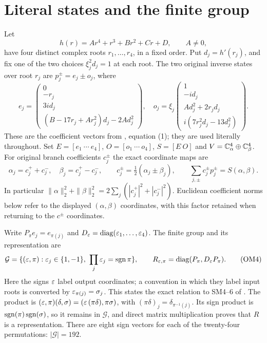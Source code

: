 \section{Literal states and the finite group}
Let
\[
 h(r)=Ar^4+r^3+Br^2+Cr+D,\qquad A\ne0,
 \tag{OM1}
\]
have four distinct complex roots $r_1,\ldots,r_4$, in a fixed order.
Put $d_j=h'(r_j)$, and fix one of the two choices
$\xi_j^2d_j=1$ at each root.  The two original inverse states over
root $r_j$ are $p_j^\pm=e_j\pm o_j$, where
\[
e_j=\begin{pmatrix}
0\\-r_j\\3id_j\\(B-17r_j+Ar_j^2)d_j-2Ad_j^2
\end{pmatrix},\quad
o_j=\xi_j\begin{pmatrix}
1\\-id_j\\Ad_j^2+2r_jd_j\\i(7r_j^2d_j-13d_j^2)
\end{pmatrix}.
\tag{OM2}
\]
These are the coefficient vectors from \cite{sforbit:Incoming}, equation (1);
they are used literally throughout.  Set $E=[e_1\ \cdots\ e_4]$,
$O=[o_1\ \cdots\ o_4]$, $S=[E\ O]$ and
$V=\mathbb C^4_\alpha\oplus\mathbb C^4_\beta$.  For original branch coefficients
$c_j^\pm$ the exact coordinate maps are
\[
\alpha_j=c_j^++c_j^-,\quad \beta_j=c_j^+-c_j^-,
\qquad c_j^\pm=\tfrac12(\alpha_j\pm\beta_j),
\qquad \sum_{j,\pm}c_j^\pm p_j^\pm=S(\alpha,\beta).
\tag{OM3}
\]
In particular $\|\alpha\|_2^2+\|\beta\|_2^2=
2\sum_j(|c_j^+|^2+|c_j^-|^2)$.  Euclidean coefficient norms below
refer to the displayed $(\alpha,\beta)$ coordinates, with this factor
retained when returning to the $c^\pm$ coordinates.

Write $P_\pi e_j=e_{\pi(j)}$ and $D_\varepsilon=\operatorname{diag}(\varepsilon_1,\ldots,\varepsilon_4)$.
The finite group and its representation are
\[
\mathcal G=\{(\varepsilon,\pi):\varepsilon_j\in\{1,-1\},
       \ \prod_j\varepsilon_j=\operatorname{sgn}\pi\},\qquad
R_{\varepsilon,\pi}=\operatorname{diag}(P_\pi,D_\varepsilon P_\pi).
\tag{OM4}
\]
Here the signs $\varepsilon$ label output coordinates; a convention in which
they label input roots is converted by $\varepsilon_{\pi(j)}=\sigma_j$.
This states the exact relation to SM4--6 of \cite{sforbit:Fable}.
The product is
$(\varepsilon,\pi)(\delta,\sigma)=(\varepsilon\,(\pi\delta),\pi\sigma)$, with
$(\pi\delta)_j=\delta_{\pi^{-1}(j)}$.  Its sign product is
$\operatorname{sgn}(\pi)\operatorname{sgn}(\sigma)$, so it remains in $\mathcal G$, and direct
matrix multiplication proves that $R$ is a representation.  There
are eight sign vectors for each of the twenty-four permutations:
$|\mathcal G|=192$.


